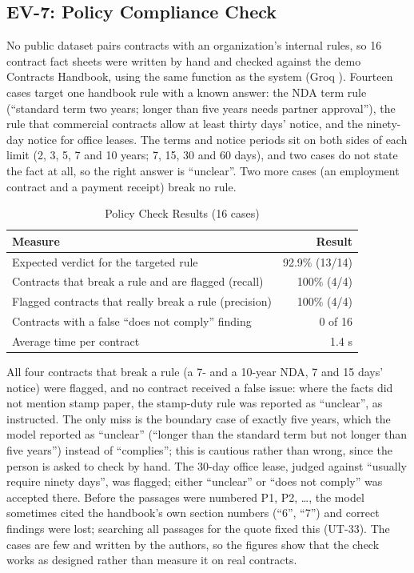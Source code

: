 \subsection{EV-7: Policy Compliance Check}\label{sec:ev-policy}
No public dataset pairs contracts with an organization's internal rules, so 16 contract fact sheets were
written by hand and checked against the demo Contracts Handbook, using the same  function as
the system (Groq ). Fourteen cases target one handbook rule with a known answer: the NDA
term rule (``standard term two years; longer than five years needs partner approval''), the rule that
commercial contracts allow at least thirty days' notice, and the ninety-day notice for office leases. The
terms and notice periods sit on both sides of each limit (2, 3, 5, 7 and 10 years; 7, 15, 30 and 60 days),
and two cases do not state the fact at all, so the right answer is ``unclear''. Two more cases (an
employment contract and a payment receipt) break no rule.

\begin{table}[H]\centering
\caption{Policy Check Results (16 cases)}\label{tab:ev-policy}
\begin{tabular}{|l|r|}\hline
\textbf{Measure} & \textbf{Result} \\ \hline
Expected verdict for the targeted rule & 92.9\% (13/14) \\ \hline
Contracts that break a rule and are flagged (recall) & 100\% (4/4) \\ \hline
Flagged contracts that really break a rule (precision) & 100\% (4/4) \\ \hline
Contracts with a false ``does not comply'' finding & 0 of 16 \\ \hline
Average time per contract & 1.4 s \\ \hline
\end{tabular}
\end{table}
All four contracts that break a rule (a 7- and a 10-year NDA, 7 and 15 days' notice) were flagged, and no
contract received a false issue: where the facts did not mention stamp paper, the stamp-duty rule was
reported as ``unclear'', as instructed. The only miss is the boundary case of exactly five years, which the
model reported as ``unclear'' (``longer than the standard term but not longer than five years'') instead of
``complies''; this is cautious rather than wrong, since the person is asked to check by hand. The 30-day
office lease, judged against ``usually require ninety days'', was flagged; either ``unclear'' or ``does not
comply'' was accepted there. Before the passages were numbered P1, P2, \dots, the model sometimes cited the
handbook's own section numbers (``6'', ``7'') and correct findings were lost; searching all passages for the
quote fixed this (UT-33). The cases are few and written by the authors, so the figures show that the
check works as designed rather than measure it on real contracts.

